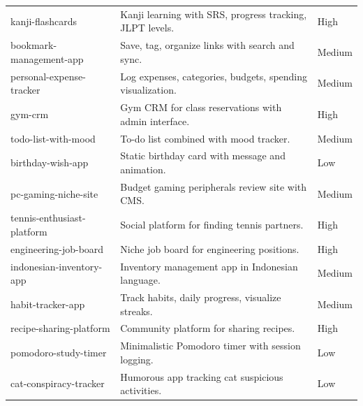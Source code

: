 \documentclass[11pt]{article}
\begin{document}
\begin{table}[h]
\begin{tabular}{p{3cm}p{8cm}p{1.5cm}}
kanji-flashcards & Kanji learning with SRS, progress tracking, JLPT levels. & High \\
bookmark-management-app & Save, tag, organize links with search and sync. & Medium \\
personal-expense-tracker & Log expenses, categories, budgets, spending visualization. & Medium \\
gym-crm & Gym CRM for class reservations with admin interface. & High \\
todo-list-with-mood & To-do list combined with mood tracker. & Medium \\
birthday-wish-app & Static birthday card with message and animation. & Low \\
pc-gaming-niche-site & Budget gaming peripherals review site with CMS. & Medium \\
tennis-enthusiast-platform & Social platform for finding tennis partners. & High \\
engineering-job-board & Niche job board for engineering positions. & High \\
indonesian-inventory-app & Inventory management app in Indonesian language. & Medium \\
habit-tracker-app & Track habits, daily progress, visualize streaks. & Medium \\
recipe-sharing-platform & Community platform for sharing recipes. & High \\
pomodoro-study-timer & Minimalistic Pomodoro timer with session logging. & Low \\
cat-conspiracy-tracker & Humorous app tracking cat suspicious activities. & Low \\
\bottomrule
\end{tabular}
\end{table}

\end{document}

